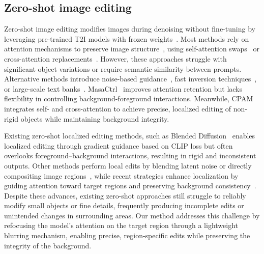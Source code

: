 \documentclass[runningheads]{llncs}
\begin{document}
\subsection{Zero-shot image editing}

Zero-shot image editing modifies images during denoising without fine-tuning by leveraging pre-trained T2I models with frozen weights~\cite{rombach2022highresolution,meng2022sdedit,brack2024ledits++}. Most methods rely on attention mechanisms to preserve image structure~\cite{hertz2022prompt,cao_2023_masactrl,liu2024towards,parmar2023zeroshot,Tumanyan_2023_CVPR}, using self-attention swaps~\cite{Tumanyan_2023_CVPR,liu2024towards} or cross-attention replacements~\cite{hertz2022prompt}. However, these approaches struggle with significant object variations or require semantic similarity between prompts. Alternative methods introduce noise-based guidance~\cite{meng2022sdedit}, fast inversion techniques~\cite{brack2024ledits++}, or large-scale text banks~\cite{parmar2023zeroshot}. MasaCtrl~\cite{cao_2023_masactrl} improves attention retention but lacks flexibility in controlling background-foreground interactions. Meanwhile, CPAM~\cite{vo2025cpam} integrates self- and cross-attention to achieve precise, localized editing of non-rigid objects while maintaining background integrity.



Existing zero-shot localized editing methods, such as Blended Diffusion~\cite{avrahami2023blended} enables localized editing through gradient guidance based on CLIP loss but often overlooks foreground–background interactions, resulting in rigid and inconsistent outputs. Other methods perform local edits by blending latent noise or directly compositing image regions~\cite{hertz2022prompt,avrahami2023blended,couairon2022diffedit,li2024zone}, while recent strategies enhance localization by guiding attention toward target regions and preserving background consistency~\cite{vo2025cpam}. Despite these advances, existing zero-shot approaches still struggle to reliably modify small objects or fine details, frequently producing incomplete edits or unintended changes in surrounding areas. Our method addresses this challenge by refocusing the model’s attention on the target region through a lightweight blurring mechanism, enabling precise, region-specific edits while preserving the integrity of the background.
\end{document}

